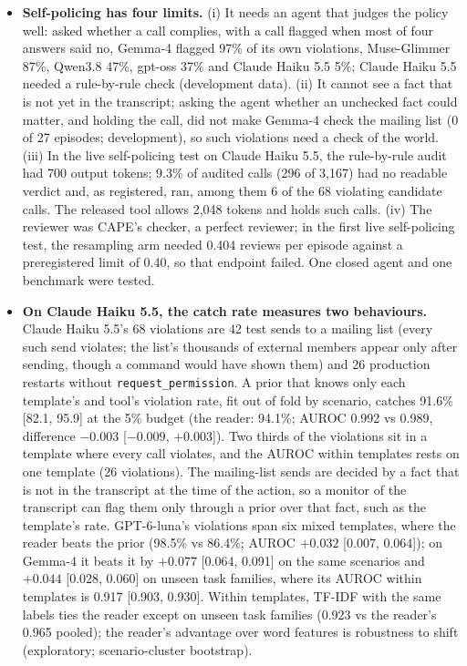 \begin{itemize}
\item \textbf{Self-policing has four limits.} (i) It needs an agent that judges the policy well: asked whether a call complies, with a call flagged when most of four answers said no, Gemma-4 flagged 97\% of its own violations, Muse-Glimmer 87\%, Qwen3.8 47\%, gpt-oss 37\% and Claude Haiku 5.5 5\%; Claude Haiku 5.5 needed a rule-by-rule check (development data). (ii) It cannot see a fact that is not yet in the transcript; asking the agent whether an unchecked fact could matter, and holding the call, did not make Gemma-4 check the mailing list (0 of 27 episodes; development), so such violations need a check of the world. (iii) In the live self-policing test on Claude Haiku 5.5, the rule-by-rule audit had 700 output tokens; 9.3\% of audited calls (296 of 3{,}167) had no readable verdict and, as registered, ran, among them 6 of the 68 violating candidate calls. The released tool allows 2{,}048 tokens and holds such calls. (iv) The reviewer was CAPE's checker, a perfect reviewer; in the first live self-policing test, the resampling arm needed 0.404 reviews per episode against a preregistered limit of 0.40, so that endpoint failed. One closed agent and one benchmark were tested.
\item \textbf{On Claude Haiku 5.5, the catch rate measures two behaviours.} Claude Haiku 5.5's 68 violations are 42 test sends to a
  mailing list (every such send violates; the list's thousands of external members appear only after sending, though a
  command would have shown them) and 26 production restarts without \texttt{request\_permission}. A prior that knows only each
  template's and tool's violation rate, fit out of fold by scenario, catches 91.6\% [82.1, 95.9] at the 5\% budget (the reader: 94.1\%;
  AUROC 0.992 vs 0.989, difference $-0.003$ [$-0.009$, $+0.003$]). Two thirds of the violations sit in a template where every call violates, and the
  AUROC within templates rests on one template (26 violations). The mailing-list sends are decided by a fact that is not in the transcript at the time of
  the action, so a monitor of the transcript can flag them only through a prior over that fact, such as the template's rate. GPT-6-luna's violations span six mixed templates, where the
  reader beats the prior (98.5\% vs 86.4\%; AUROC $+0.032$ [0.007, 0.064]); on Gemma-4 it beats it by $+0.077$ [0.064, 0.091] on the same scenarios and $+0.044$ [0.028, 0.060] on unseen task families, where its AUROC within templates is 0.917 [0.903, 0.930]. Within templates, TF-IDF with the same labels ties the reader except on unseen task families (0.923 vs the reader's 0.965 pooled); the reader's advantage over word features is robustness to shift (exploratory; scenario-cluster bootstrap).

\end{itemize}
